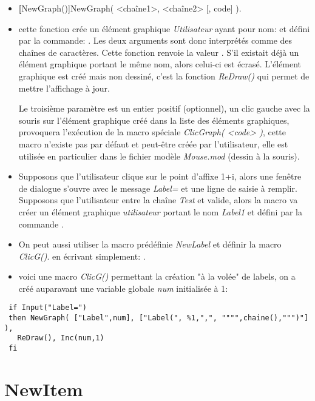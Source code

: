 \begin{itemize}
 \item \util \textbf[NewGraph()]{NewGraph( <chaîne1>, <chaîne2> [, code] )}.
 \item \desc cette fonction crée un élément graphique \textsl{Utilisateur} ayant pour nom:  et défini par la commande: . Les deux arguments sont donc interprétés comme des chaînes de caractères. Cette fonction renvoie la valeur \Nil. S'il existait déjà un élément graphique portant le même nom, alors celui-ci est écrasé. L'élément graphique est créé mais non dessiné, c'est la fonction \textsl{ReDraw()} qui permet de mettre l'affichage à jour.

 Le troisième paramètre  est un entier positif (optionnel), un clic gauche avec la souris sur l'élément graphique créé dans la liste des éléments graphiques, provoquera l'exécution de la macro spéciale \textsl{ClicGraph( <code> )}, cette macro n'existe pas par défaut et peut-être créée par l'utilisateur, elle est utilisée en particulier dans le fichier modèle \textit{Mouse.mod} (dessin à la souris). 
 \item Supposons que l'utilisateur clique sur le point d'affixe 1+i, alors une fenêtre de dialogue s'ouvre avec le message \textsl{Label=} et une ligne de saisie à remplir. Supposons que l'utilisateur entre la chaîne \textsl{Test} et valide, alors la macro va créer un élément graphique \textsl{utilisateur} portant le nom \textsl{Label1} et défini par la commande .
  \item On peut aussi utiliser la macro prédéfinie \textsl{NewLabel} et définir la macro \textsl{ClicG()}. en écrivant simplement: .
 \item \exem voici une macro \textsl{ClicG()} permettant la création "à la volée" de labels, on a créé auparavant une variable globale \textsl{num} initialisée à 1:
\end{itemize}

\begin{verbatim}
 if Input("Label=")
 then NewGraph( ["Label",num], ["Label(", %1,",", """",chaine(),""")"] ), 
   ReDraw(), Inc(num,1)
 fi
\end{verbatim}

\section{NewItem}\label{cmdNewItem}

